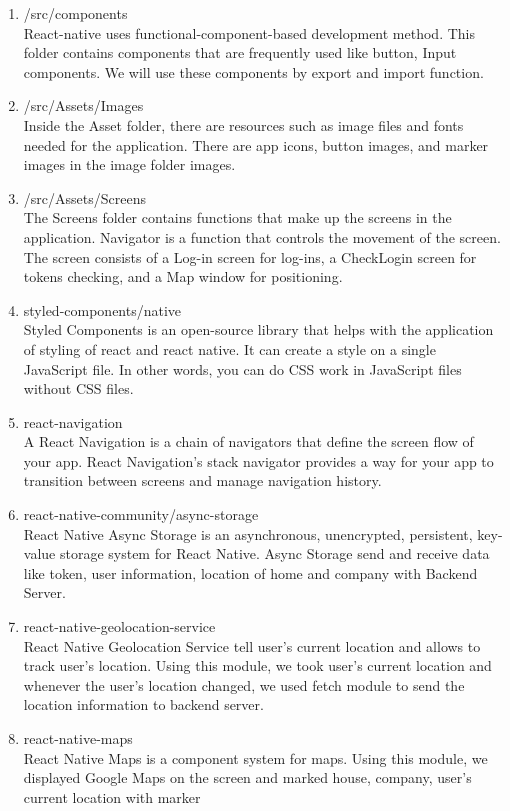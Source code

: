 \documentclass[conference]{IEEEtran}
\begin{document}
\begin{enumerate}
    \item /src/components\\
    React-native uses functional-component-based development method. This folder contains components that are frequently used like button, Input components. We will use these components by export and import function.\\
    \item /src/Assets/Images\\
    Inside the Asset folder, there are resources such as image files and fonts needed for the application. There are app icons, button images, and marker images in the image folder images.\\
    \item /src/Assets/Screens\\
    The Screens folder contains functions that make up the screens in the application. Navigator is a function that controls the movement of the screen. The screen consists of a Log-in screen for log-ins, a CheckLogin screen for tokens checking, and a Map window for positioning.\\
    \item styled-components/native\\
    Styled Components is an open-source library that helps with the application of styling of react and react native. It can create a style on a single JavaScript file. In other words, you can do CSS work in JavaScript files without CSS files.\\
    \item react-navigation\\
    A React Navigation is a chain of navigators that define the screen flow of your app. React Navigation's stack navigator provides a way for your app to transition between screens and manage navigation history.\\
    \item react-native-community/async-storage\\
    React Native Async Storage is an asynchronous, unencrypted, persistent, key-value storage system for React Native. Async Storage send and receive data like token, user information, location of home and company with Backend Server.\\
    \item react-native-geolocation-service\\
    React Native Geolocation Service tell user’s current location and allows to track user’s location. Using this module, we took user’s current location and whenever the user’s location changed, we used fetch module to send the location information to backend server.\\
    \item react-native-maps\\
    React Native Maps is a component system for maps. Using this module, we displayed Google Maps on the screen and marked house, company, user’s current location with marker\\
\end{enumerate}
\end{document}
